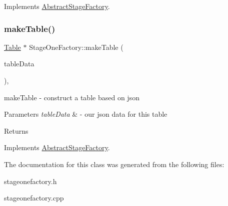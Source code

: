 Implements \mbox{\hyperlink{class_abstract_stage_factory_a6ce57859e00b135049e3b995b7dfc94d}{Abstract\+Stage\+Factory}}.

\mbox{\label{class_stage_one_factory_a31e02c98e5c428f0e1ac0a36e641310d}} 
\subsubsection{\texorpdfstring{make\+Table()}{makeTable()}}
{\footnotesize\ttfamily \mbox{\hyperlink{class_table}{Table}} $\ast$ Stage\+One\+Factory\+::make\+Table (\begin{DoxyParamCaption}\item[{const Q\+Json\+Object \&}]{table\+Data }\end{DoxyParamCaption})\hspace{0.3cm}{\ttfamily [override]}, {\ttfamily [virtual]}}



make\+Table -\/ construct a table based on json 


\begin{DoxyParams}{Parameters}
{\em table\+Data} & -\/ our json data for this table \\
\hline
\end{DoxyParams}
\begin{DoxyReturn}{Returns}

\end{DoxyReturn}


Implements \mbox{\hyperlink{class_abstract_stage_factory_a539c855ce9a09e08b7fcb3ffa7f0d3fd}{Abstract\+Stage\+Factory}}.



The documentation for this class was generated from the following files\+:\begin{DoxyCompactItemize}
\item 
stageonefactory.\+h\item 
stageonefactory.\+cpp\end{DoxyCompactItemize}
